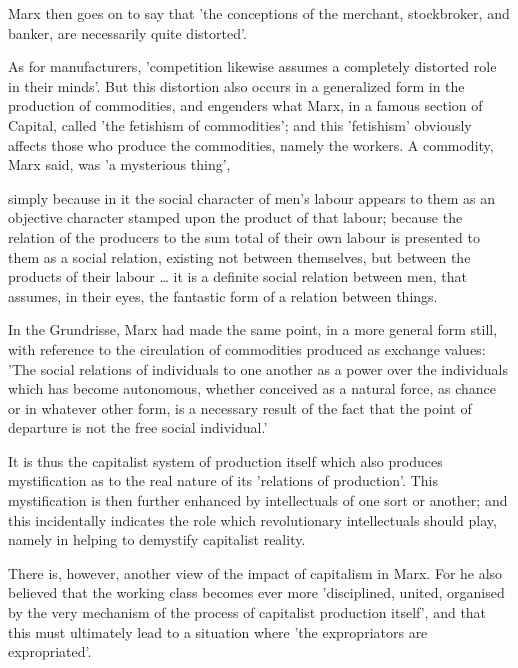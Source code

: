 Marx then goes on to say that 'the conceptions of the merchant, stockbroker, and banker, are necessarily quite distorted'.

As for manufacturers, 'competition likewise assumes a completely distorted role in their minds'. But this distortion also occurs in a generalized form in the production of commodities, and engenders what Marx, in a famous section of Capital, called 'the fetishism of commodities'; and this 'fetishism' obviously affects those who produce the commodities, namely the workers. A commodity, Marx said, was 'a mysterious thing',
\begin{displayquote}
    simply because in it the social character of men's labour appears to them as an objective character stamped upon the product of that labour; because the relation of the producers to the sum total of their own labour is presented to them as a social relation, existing not between themselves, but between the products of their labour \dots{} it is a definite social relation between men, that assumes, in their eyes, the fantastic form of a relation between things.
\end{displayquote}

In the Grundrisse, Marx had made the same point, in a more general form still, with reference to the circulation of commodities produced as exchange values: 'The social relations of individuals to one another as a power over the individuals which has become autonomous, whether conceived as a natural force, as chance or in whatever other form, is a necessary result of the fact that the point of departure is not the free social individual.'

It is thus the capitalist system of production itself which also produces mystification as to the real nature of its 'relations of production'. This mystification is then further enhanced by intellectuals of one sort or another; and this incidentally indicates the role which revolutionary intellectuals should play, namely in helping to demystify capitalist reality.

There is, however, another view of the impact of capitalism in Marx. For he also believed that the working class becomes ever more 'disciplined, united, organised by the very mechanism of  the process of capitalist production itself', and that this must ultimately lead to a situation where 'the expropriators are expropriated'.

